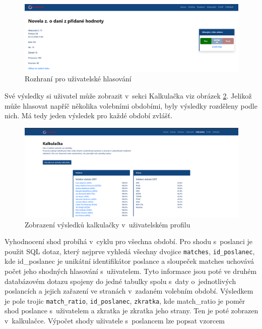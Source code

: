 \begin{figure}
    \centering
    \includegraphics[width=1\textwidth]{obrazky-figures/aplikace-hlasovani.png}
    \caption{Rozhraní pro uživatelské hlasování}
    \label{fig:aplikace-hlasovani}
\end{figure}

\par Své výsledky si uživatel může zobrazit v~sekci Kalkulačka viz obrázek \ref{fig:aplikace-kalkulacka}. Jelikož může hlasovat napříč několika volebními obdobími, byly výsledky rozděleny podle nich. Má tedy jeden výsledek pro každé období zvlášť. 

\begin{figure}
    \centering
    \includegraphics[width=1\textwidth]{obrazky-figures/aplikace-kalkulacka.png}
    \caption{Zobrazení výsledků kalkulačky v~uživatelském profilu}
    \label{fig:aplikace-kalkulacka}
\end{figure}

\par Vyhodnocení shod probíhá v~cyklu pro všechna období. Pro shodu s~poslanci je použit SQL dotaz, který nejprve vyhledá všechny dvojice \texttt{matches}, \texttt{id\_poslanec}, kde id\_poslanec je unikátní identifikátor poslance a sloupeček matches uchovává počet jeho shodných hlasování s~uživatelem. Tyto informace jsou poté ve druhém databázovém dotazu spojeny do jedné tabulky spolu s~daty o~jednotlivých poslancích a jejich zařazení ve stranách v~zadaném volebním období. Výsledkem je pole trojic \texttt{match\_ratio}, \texttt{id\_poslanec}, \texttt{zkratka}, kde match\_ratio je poměr shod poslance s~uživatelem a zkratka je zkratka jeho strany. Ten je poté zobrazen v~kalkulačce. Výpočet shody uživatele s~poslancem lze popsat vzorcem

